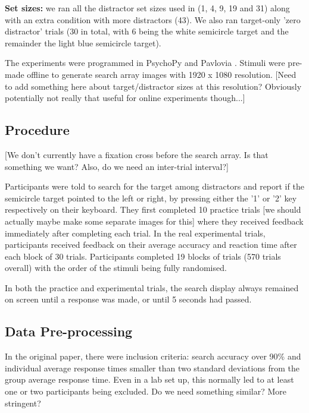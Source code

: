 \documentclass[smallextended, natbib]{svjour3}       %
\begin{document}
\textbf{Set sizes:} we ran all the distractor set sizes used in \cite{buetti2019predicting} (1, 4, 9, 19 and 31) along with an extra condition with more distractors (43). We also ran target-only 'zero distractor' trials (30 in total, with 6 being the white semicircle target and the remainder the light blue semicircle target).

The experiments were programmed in PsychoPy and Pavlovia \cite{peirce2019psychopy2}. Stimuli were pre-made offline to generate search array images with 1920 x 1080 resolution. [Need to add something here about target/distractor sizes at this resolution? Obviously potentially not really that useful for online experiments though...]

\subsection{Procedure}

[We don't currently have a fixation cross before the search array. Is that something we want? Also, do we need an inter-trial interval?]

Participants were told to search for the target among distractors and report if the semicircle target pointed to the left or right, by pressing either the '1' or '2' key respectively on their keyboard. They first completed 10 practice trials [we should actually maybe make some separate images for this] where they received feedback immediately after completing each trial. In the real experimental trials, participants received feedback on their average accuracy and reaction time after each block of 30 trials. Participants  completed 19 blocks of trials (570 trials overall) with the order of the stimuli being fully randomised.
 
In both the practice and experimental trials, the search display always remained on screen until a response was made, or until 5 seconds had passed. 

\subsection{Data Pre-processing}

In the original paper, there were inclusion criteria: search accuracy over 90\% and individual average response times smaller than two standard deviations from the group average response time. Even in a lab set up, this normally led to at least one or two participants being excluded. Do we need something similar? More stringent?
\end{document}
